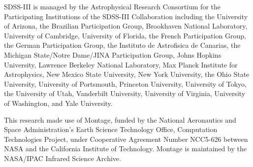 \documentclass[10pt,preprint]{aastex}
\begin{document}
SDSS-III is managed by the Astrophysical Research Consortium for the
Participating Institutions of the SDSS-III Collaboration including the
University of Arizona, the Brazilian Participation Group, Brookhaven
National Laboratory, University of Cambridge, University of Florida,
the French Participation Group, the German Participation Group, the
Instituto de Astrofisica de Canarias, the Michigan State/Notre
Dame/JINA Participation Group, Johns Hopkins University, Lawrence
Berkeley National Laboratory, Max Planck Institute for Astrophysics,
New Mexico State University, New York University, the Ohio State
University, University of Portsmouth, Princeton University, University
of Tokyo, the University of Utah, Vanderbilt University, University of
Virginia, University of Washington, and Yale University.

This research made use of Montage, funded by the National Aeronautics and
Space Administration's Earth Science Technology Office, Computation
Technologies Project, under Cooperative Agreement Number NCC5-626 between
NASA and the California Institute of Technology. Montage is maintained by
the NASA/IPAC Infrared Science Archive.




\newpage


\newpage

\end{document}
